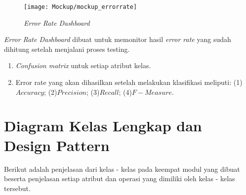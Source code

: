 \begin{figure}[H]
	\centering
	\texttt{[image: Mockup/mockup\_errorrate]}
	\caption[\textit{Error Rate Dashboard}]{\textit{Error Rate Dashboard}}
	\label{fig:Error Rate Dashboard}
\end{figure}
\textit{Error Rate Dashboard} dibuat untuk memonitor hasil \textit{error rate} yang sudah dihitung setelah menjalani proses testing. 
\begin{enumerate}
	\item \textit{Confusion matrix} untuk setiap atribut kelas.
	\item Error rate yang akan dihasilkan setelah melakukan klasifikasi meliputi: (1)$Accuracy$; (2)$Precision$; (3)$Recall$; (4)$F-Measure$.
\end{enumerate}



\section{Diagram Kelas Lengkap dan Design Pattern}
Berikut adalah penjelasan dari kelas - kelas pada keempat modul yang dibuat beserta penjelasan setiap atribut dan operasi yang dimiliki oleh kelas - kelas tersebut.

